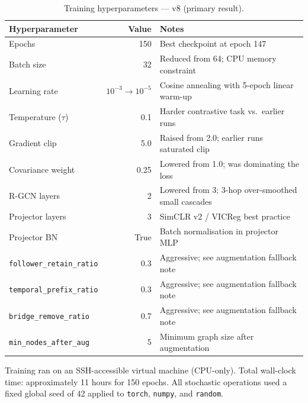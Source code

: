 \documentclass[12pt, a4paper]{article}
\begin{document}
\begin{table}[H]
\centering
\caption{Training hyperparameters --- v8 (primary result).}
\label{tab:hyperparams}
\small
\begin{tabularx}{\textwidth}{@{}lrX@{}}
\toprule
\textbf{Hyperparameter} & \textbf{Value} & \textbf{Notes} \\
\midrule
Epochs                   & 150            & Best checkpoint at epoch 147 \\
Batch size               & 32             & Reduced from 64; CPU memory constraint \\
Learning rate            & $10^{-3} \to 10^{-5}$ & Cosine annealing with 5-epoch linear warm-up \\
Temperature ($\tau$)     & 0.1            & Harder contrastive task vs.\ earlier runs \\
Gradient clip            & 5.0            & Raised from 2.0; earlier runs saturated clip \\
Covariance weight        & 0.25           & Lowered from 1.0; was dominating the loss \\
R-GCN layers             & 2              & Lowered from 3; 3-hop over-smoothed small cascades \\
Projector layers         & 3              & SimCLR v2 / VICReg best practice \\
Projector BN             & True           & Batch normalisation in projector MLP \\
\texttt{follower\_retain\_ratio} & 0.3   & Aggressive; see augmentation fallback note \\
\texttt{temporal\_prefix\_ratio} & 0.3   & Aggressive; see augmentation fallback note \\
\texttt{bridge\_remove\_ratio}   & 0.7   & Aggressive; see augmentation fallback note \\
\texttt{min\_nodes\_after\_aug}  & 5     & Minimum graph size after augmentation \\
\bottomrule
\end{tabularx}
\end{table}

Training ran on an SSH-accessible virtual machine (CPU-only). Total wall-clock time: approximately 11 hours for 150 epochs. All stochastic operations used a fixed global seed of 42 applied to \texttt{torch}, \texttt{numpy}, and \texttt{random}.
\end{document}
